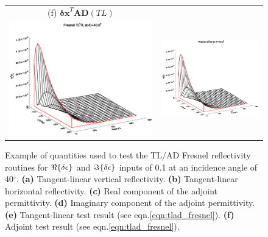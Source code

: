 \begin{figure}[htp]
\begin{tabular}{c c}
    \textsf{(f)} $\mathbf{\delta x}^{T}\mathbf{AD}(TL)$ \\
    \includegraphics[bb=110 240 508 540,clip,scale=0.5]{graphics/Fresnel/TLAD/TLtTL_z40.0.eps} & 
    \includegraphics[bb=110 240 508 540,clip,scale=0.5]{graphics/Fresnel/TLAD/dxtAD_z40.0.eps}
  \end{tabular}
  \caption{Example of quantities used to test the TL/AD Fresnel reflectivity routines for $\Re\{\delta\epsilon\}$ and $\Im\{\delta\epsilon\}$ inputs of 0.1 at an incidence angle of 40$^{\circ}$. \textbf{(a)} Tangent-linear vertical reflectivity. \textbf{(b)} Tangent-linear horizontal reflectivity. \textbf{(c)} Real component of the adjoint permittivity.  \textbf{(d)} Imaginary component of the adjoint permittivity. \textbf{(e)} Tangent-linear test result (see eqn.\ref{eqn:tlad_fresnel}). \textbf{(f)} Adjoint test result (see eqn.\ref{eqn:tlad_fresnel}).}
  \label{fig:tlad_z40.0_fresnel}
\end{figure}

